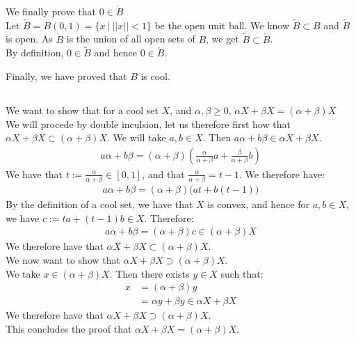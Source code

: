 \documentclass{article}
\begin{document}
We finally prove that $0 \in \mathring{B}$ \\
Let $\widetilde{B}=B(0,1) = \{x \ | \  ||x|| < 1 \}$ be the open unit ball. We know $\widetilde{B} \subset B$ and $\widetilde{B}$ is open. As $\mathring{B}$ is the union of all open sets of $B$, we get $\widetilde{B} \subset \mathring{B}$. \\
By definition, $0 \in \widetilde{B}$ and hence $0 \in \mathring{B}$. 

\noindent Finally, we have proved that $B$ is cool.





\subsection{}%
We want to show that for a cool set $X$, and $\alpha,\beta \geq 0, \, \alpha X + \beta X = (\alpha + \beta )X$\\
We will procede by double inculsion, let us therefore first how that $\alpha X + \beta X \subset (\alpha + \beta )X$. We will take $a,b \in X$. Then $a\alpha + b\beta \in  \alpha X + \beta X$.
\begin{align*}
	a\alpha + b\beta = (\alpha + \beta )\left( \frac{\alpha}{\alpha + \beta}a +  \frac{\beta}{\alpha + \beta}b \right)
\end{align*}
We have that $t := \frac{\alpha}{\alpha + \beta} \in [0,1]$, and that $\frac{\alpha}{\alpha + \beta} = t-1$. We therefore have:
\begin{align*}
	a\alpha + b\beta = (\alpha + \beta )\big(at + b(t-1)\big)
\end{align*}
By the definition of a cool set, we have that $X$ is convex, and hence for $a,b \in X$, we have $c:=ta + (t-1)b \in X$. Therefore:
\begin{align*}
	a\alpha + b\beta = (\alpha + \beta )c \in (\alpha + \beta )X
\end{align*}
We therefore have that $\alpha X + \beta X \subset (\alpha + \beta )X$.\\We now want to show that $\alpha X + \beta X \supset (\alpha + \beta )X$.\\ We take $x \in (\alpha + \beta )X$. Then there exists $y \in X$ such that:
\begin{align*}
	x &= (\alpha + \beta )y\\
	&= \alpha y + \beta y \in \alpha X + \beta X
\end{align*}
We therefore have that $\alpha X + \beta X \supset (\alpha + \beta )X$.\\ This concludes the proof that $\alpha X + \beta X = (\alpha + \beta )X$.
\end{document}
